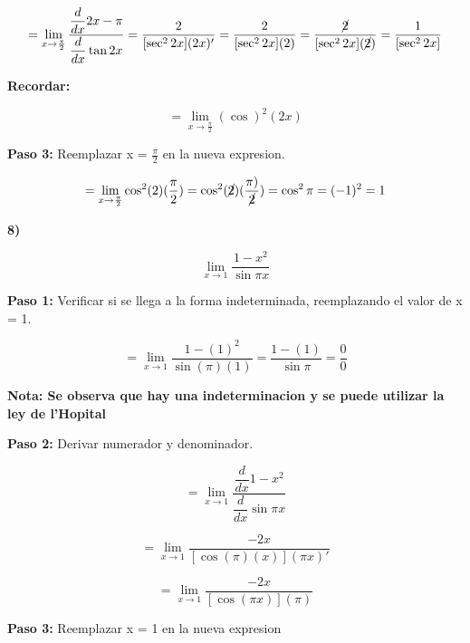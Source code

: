 \documentclass[12pt,a4paper]{article}
\begin{document}
\[
= \lim_{x \to \frac{\pi}{2}} \frac{\dfrac{d}{dx} 2x - \pi}{\dfrac{d}{dx} \tan 2x}= \frac{2}{[\sec^2 2x](2x)'}= \frac{2}{[\sec^2 2x](2)}= \frac{\cancel{2}}{[\sec^2 2x](\cancel{2})}= \frac{1}{[\sec^2 2x]}
\]


\textbf{Recordar:}

\begin{center}{}
\end{center}

\[
= \lim_{x \to \frac{\pi}{2}} (\cos) ^2 (2x)
\]

\vspace{0.2cm}



\textbf{Paso 3:}
\vspace{0.2cm}
Reemplazar x = $\frac{\pi}{2}$ en la nueva expresion.

\[
= \lim_{x \to \frac{\pi}{2}} \cos^2 (2)(\frac{\pi}{2})= \cos^2 (\cancel{2})(\frac{\pi)}{\cancel{2}}) = \cos ^2 \pi = (-1)^{2} = 1
\]


\newpage

\textbf{8)}

\[
\lim_{x \to 1} \frac{1-x^2}{\sin \pi x} 
\]

\vspace{0.2cm}

\textbf{Paso 1:}
\vspace{0.2cm}
Verificar si se llega a la forma indeterminada, reemplazando el valor de x = 1.

\[
= \lim_{x \to 1} \frac{1-(1)^2}{\sin (\pi) (1)} = \frac{1-(1)}{\sin \pi} = \frac{0}{0}
\]


\vspace{0.2cm}

\textbf{Nota: Se observa que hay una indeterminacion y se puede utilizar la ley de l'Hopital }

\vspace{0.5cm}

\textbf{Paso 2:}
\vspace{0.2cm}
Derivar numerador y denominador.

\[
= \lim_{x \to 1 } \frac{\dfrac{d}{dx} 1-x^2}{\dfrac{d}{dx} \sin \pi x}
\]

\[
= \lim_{x \to 1} \frac{-2x}{[\cos (\pi)(x)](\pi x)'}
\]

\[
= \lim_{x \to 1} \frac{-2x}{[\cos (\pi x)](\pi)}
\]
\vspace{0.2cm}



\textbf{Paso 3:}
\vspace{0.2cm}
Reemplazar x = 1 en la nueva expresion
\end{document}
